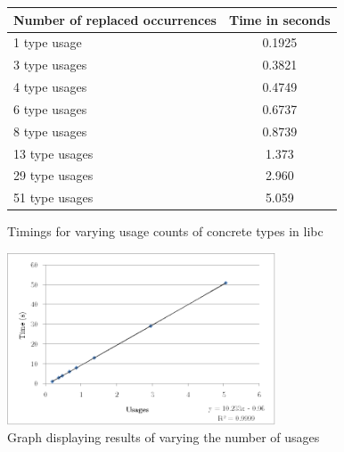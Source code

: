 \begin{figure}[h]
\begin{center}
    \begin{tabular}{ | l | c |}
    \hline
    \textbf{Number of replaced occurrences} & \textbf{Time in seconds} \\ \hline
    1 type usage &  0.1925  \\ \hline
    3 type usages &  0.3821  \\ \hline
    4 type usages &   0.4749  \\ \hline
    6 type usages &   0.6737  \\ \hline
    8 type usages &   0.8739 \\ \hline
    13 type usages  &  1.373 \\ \hline
    29 type usages &  2.960  \\ \hline
    51 type usages &  5.059 \\ \hline
    \end{tabular}
\end{center}

\caption{Timings for varying usage counts of concrete types in libc}
\label{Fig:scaling}
\end{figure}

\begin{figure}[h]
\begin{center}

\includegraphics[width=8cm]{scaling}

\caption{Graph displaying results of varying the number of usages}
\label{Fig:comparerefs}
\end{center}
\end{figure}